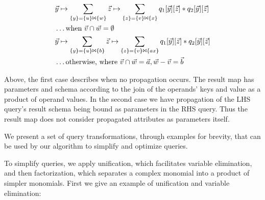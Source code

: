 {\vspace{-4mm}
\begin{align*}
& \vec{y} \mapsto
\sum_{\{y\} = \{u\} \Join \{w\}} 
\vec{z} \mapsto
  \sum_{\{z\} = \{v\} \Join \{x\}}
  q_1[\vec{y}][\vec{z}] * q_2[\vec{y}][\vec{z}]
\\
& \ldots \mbox{when $\vec{v} \cap \vec{w} = \emptyset$}
\\
& \vec{y} \mapsto
\sum_{\{y\} = \{u\} \Join \{b\}} 
\vec{z} \mapsto
  \sum_{\{z\} = \{v\} \Join \{ax\}}
  q_1[\vec{y}][\vec{z}] * q_2[\vec{y}][\vec{z}]
\\
& \ldots \mbox{otherwise, where $\vec{v} \cap \vec{w} = \vec{a}, 
\vec{w} - \vec{v} = \vec{b}$}
\end{align*}

Above, the first case describes when no propagation occurs. The result map has
parameters and schema according to the join of the operands' keys and value as a
product of operand values. In the second case we have propagation of the LHS
query's result schema being bound as parameters in the RHS query. Thus the
result map does not consider propagated attributes as parameters itself.
}


\vspace{0.5mm}
We present a set of query transformations, through examples for brevity, that
can be used by our algorithm to simplify and optimize queries.

To simplify queries, we apply unification, which facilitates variable
elimination, and then factorization, which separates a complex monomial into a
product of simpler monomials. First we give an example of unification and
variable elimination: 

